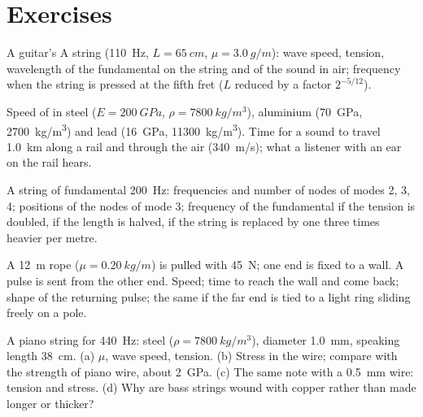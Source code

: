 \section{Exercises}

\begin{exercise}[$\star$]\label{exo:b2:waves-on-strings:1}
A guitar's A string (\qty{110}{Hz}, $L = \qty{65}{cm}$, $\mu = \qty{3.0}{g/m}$):
wave speed, tension, wavelength of the fundamental on the string and
of the sound in air; frequency when the string is pressed at the fifth
fret ($L$ reduced by a factor $2^{-5/12}$).
\end{exercise}

\begin{exercise}[$\star$]\label{exo:b2:waves-on-strings:2}
Speed of  in steel ($E = \qty{200}{GPa}$, $\rho =
\qty{7800}{kg/m^3}$), aluminium (\qty{70}{GPa}, \qty{2700}{kg/m^3}) and lead
(\qty{16}{GPa}, \qty{11300}{kg/m^3}). Time for a sound to travel \qty{1.0}{km}
along a rail and through the air (\qty{340}{m/s}); what a listener with an
ear on the rail hears.
\end{exercise}

\begin{exercise}[$\star$]\label{exo:b2:waves-on-strings:3}
A string of fundamental \qty{200}{Hz}: frequencies and number of nodes of
modes 2, 3, 4; positions of the nodes of mode 3; frequency of the
fundamental if the tension is doubled, if the length is halved, if the
string is replaced by one three times heavier per metre.
\end{exercise}

\begin{exercise}[$\star$]\label{exo:b2:waves-on-strings:4}
A \qty{12}{m} rope ($\mu = \qty{0.20}{kg/m}$) is pulled with \qty{45}{N}; one
end is fixed to a wall. A pulse is sent from the other end. Speed;
time to reach the wall and come back; shape of the returning pulse;
the same if the far end is tied to a light ring sliding freely on a
pole.
\end{exercise}

\begin{exercise}[$\star\star$]\label{exo:b2:waves-on-strings:5}
A piano string for \qty{440}{Hz}: steel ($\rho = \qty{7800}{kg/m^3}$),
diameter \qty{1.0}{mm}, speaking length \qty{38}{cm}. (a) $\mu$, wave speed,
tension. (b) Stress in the wire; compare with the strength of piano
wire, about \qty{2}{GPa}. (c) The same note with a \qty{0.5}{mm} wire: tension
and stress. (d) Why are bass strings wound with copper rather than made
longer or thicker?
\end{exercise}

